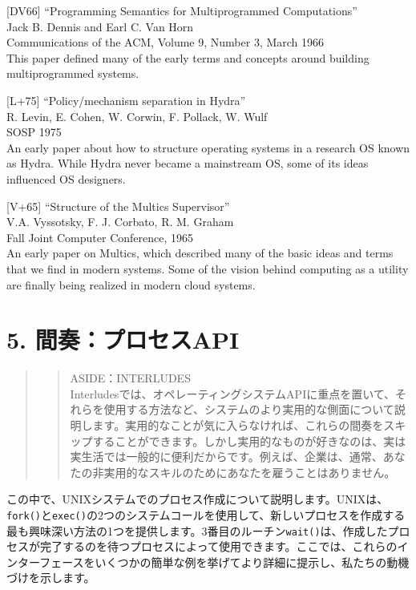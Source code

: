 {[}DV66{]} ``Programming Semantics for Multiprogrammed Computations''\\
Jack B. Dennis and Earl C. Van Horn\\
Communications of the ACM, Volume 9, Number 3, March 1966\\
This paper defined many of the early terms and concepts around building
multiprogrammed systems.

{[}L+75{]} ``Policy/mechanism separation in Hydra''\\
R. Levin, E. Cohen, W. Corwin, F. Pollack, W. Wulf\\
SOSP 1975\\
An early paper about how to structure operating systems in a research OS
known as Hydra. While Hydra never became a mainstream OS, some of its
ideas influenced OS designers.

{[}V+65{]} ``Structure of the Multics Supervisor''\\
V.A. Vyssotsky, F. J. Corbato, R. M. Graham\\
Fall Joint Computer Conference, 1965\\
An early paper on Multics, which described many of the basic ideas and
terms that we find in modern systems. Some of the vision behind
computing as a utility are finally being realized in modern cloud
systems.

\hypertarget{ux9593ux594fux30d7ux30edux30bbux30b9api}{%
\section*{5.
間奏：プロセスAPI}\label{ux9593ux594fux30d7ux30edux30bbux30b9api}}

\begin{quote}
\begin{quote}
ASIDE：INTERLUDES\\
Interludesでは、オペレーティングシステムAPIに重点を置いて、それらを使用する方法など、システムのより実用的な側面について説明します。実用的なことが気に入らなければ、これらの間奏をスキップすることができます。しかし実用的なものが好きなのは、実は実生活では一般的に便利だからです。例えば、企業は、通常、あなたの非実用的なスキルのためにあなたを雇うことはありません。
\end{quote}
\end{quote}

この中で、UNIXシステムでのプロセス作成について説明します。UNIXは、\texttt{fork()}と\texttt{exec()}の2つのシステムコールを使用して、新しいプロセスを作成する最も興味深い方法の1つを提供します。3番目のルーチン\texttt{wait()}は、作成したプロセスが完了するのを待つプロセスによって使用できます。ここでは、これらのインターフェースをいくつかの簡単な例を挙げてより詳細に提示し、私たちの動機づけを示します。

